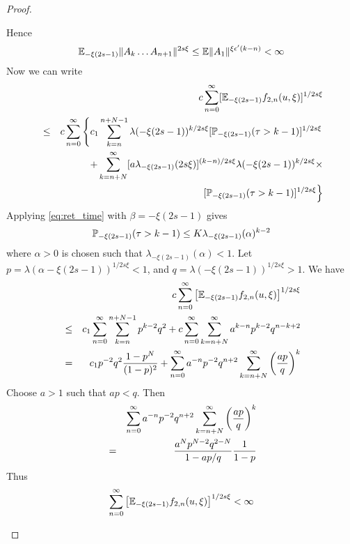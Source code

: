 \documentclass{article}
\begin{document}
\begin{proof}
\begin{enumerate}
\begin{enumerate}
\begin{enumerate}
\[        \]
        Hence
        \[
        \E_{-\xi(2s - 1)} \|A_k \dots A_{n+1}\|^{2s\xi} \leq
        \E \|A_1\|^{\xi \epsilon' (k-n)} < \infty      
        \]
        Now we can write
        \begin{eqnarray*}
          && c \sum_{n=0}^\infty [\E_{-\xi(2s - 1)} f_{2,n}(u,\xi)]^{1/2s\xi} \\
          &\leq& c \sum_{n=0}^\infty \left\{
                 c_1 \sum_{k=n}^{n+N-1} \lambda(-\xi(2s - 1))^{k/2s\xi} [\P_{-\xi(2s -
                 1)}(\tau > k-1)]^{1/2s\xi} \right.\\
          && + \sum_{k=n+N}^\infty [a \lambda_{-\xi(2s - 1)}(2s\xi)]^{(k-n)/2s\xi}
             \lambda(-\xi(2s - 1))^{k/2s\xi} \times \\
          && \left.[\P_{-\xi(2s - 1)}(\tau > k-1)]^{1/2s\xi}
             \right\}
        \end{eqnarray*}
        Applying \eqref{eq:ret_time} with $\beta = -\xi(2s - 1)$ gives
        \[
        \P_{-\xi(2s - 1)}(\tau > k-1) \leq K \lambda_{-\xi(2s - 1)}(\alpha)^{k-2}
        \]
        where $\alpha > 0$ is chosen such that $\lambda_{-\xi(2s -
          1)}(\alpha) < 1$.
        Let $p = \lambda(\alpha - \xi(2s - 1))^{1/2s\xi} < 1$, and $q =
        \lambda(-\xi(2s - 1))^{1/2s\xi} > 1$. We have
        \begin{eqnarray*}
          && c \sum_{n=0}^\infty \left[
             \E_{-\xi(2s - 1)} f_{2,n}(u,\xi)
             \right]^{1/2s\xi} \\
          &\leq& c_1 \sum_{n=0}^\infty \sum_{k=n}^{n+N-1} p^{k-2} q^{2} +
                 c \sum_{n=0}^{\infty} \sum_{k=n+N}^\infty a^{k-n} p^{k-2}
                 q^{n-k+2} \\
          &=& c_1 p^{-2} q^2 {1 - p^N \over (1-p)^2 }
              + \sum_{n=0}^{\infty} a^{-n} p^{-2} q^{n+2} \sum_{k=n+N}^{\infty}
              \left({ap \over q}\right)^k
        \end{eqnarray*}
        Choose $a > 1$ such that $ap < q$. Then
        \begin{eqnarray*}
          && \sum_{n=0}^{\infty} a^{-n} p^{-2} q^{n+2} \sum_{k=n+N}^{\infty}
             \left({ap \over q}\right)^k \\
          &=& \frac{
              a^N p^{N-2} q^{2-N}
              }{
              1 - ap/q
              } {1 \over 1 - p}
        \end{eqnarray*}
        Thus
        \[
        \sum_{n=0}^\infty \left[
          \E_{-\xi(2s - 1)} f_{2,n}(u,\xi)
        \right]^{1/2s\xi} < \infty  
        \]


\end{enumerate}
\end{enumerate}
\end{enumerate}
\end{proof}
\end{document}

